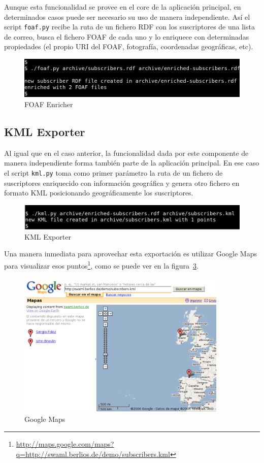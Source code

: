 Aunque esta funcionalidad se provee en el core de la aplicación principal,
en determinados casos puede ser necesario su uso de manera independiente.
Así el script \texttt{foaf.py} recibe la ruta de un fichero RDF con los
suscriptores de una lista de correo, busca el fichero FOAF de cada uno y
lo enriquece con determinadas propiedades (el propio URI del FOAF, fotografía,
coordenadas geográficas, etc).

\begin{figure}[H]
	\centering
	\includegraphics[width=12cm]{images/screenshots/foaf-enricher.png}
	\caption{FOAF Enricher}
	\label{fig:foaf-enricher}
\end{figure}

\subsection*{KML Exporter}

Al igual que en el caso anterior, la funcionalidad dada por este componente
de manera independiente forma también parte de la aplicación principal. En ese
caso el script \texttt{kml.py} toma como primer parámetro la ruta de un fichero
de suscriptores enriquecido con información geográfica y genera otro fichero
en formato KML posicionando geográficamente los suscriptores.

\begin{figure}[H]
	\centering
	\includegraphics[width=12cm]{images/screenshots/kml-exporter.png}
	\caption{KML Exporter}
	\label{fig:kml-exporter}
\end{figure}

Una manera inmediata para aprovechar esta exportación es utilizar Google Maps para visualizar esos
puntos\footnote{\url{http://maps.google.com/maps?q=http://swaml.berlios.de/demo/subscribers.kml}},
como se puede ver en la figura~\ref{fig:googlemaps}.

\begin{figure}[H]
	\centering
	\includegraphics[width=10cm]{images/screenshots/googlemaps.png}
	\caption{Google Maps}
	\label{fig:googlemaps}
\end{figure}

